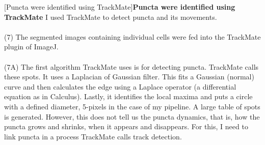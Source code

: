 \begin{centering}
\captionsetup{parbox=none}
[Puncta were identified using TrackMate]{\textbf{Puncta were identified using TrackMate} I used TrackMate to detect puncta and its movements.
\\
\\
(7) The segmented images containing individual cells were fed into the TrackMate plugin of ImageJ.
\\
\\
(7A) The first algorithm TrackMate uses is for detecting puncta. TrackMate calls these spots. It uses a Laplacian of Gaussian filter. This fits a Gaussian (normal) curve and then calculates the edge using a Laplace operator (a differential equation as in Calculus). Lastly, it identifies the local maxima and puts a circle with a defined diameter, 5-pixels in the case of my pipeline. A large table of spots is generated. However, this does not tell us the puncta dynamics, that is, how the puncta grows and shrinks, when it appears and disappears. For this, I need to link puncta in a process TrackMate calls track detection.
\\
\\
}
\end{centering}
